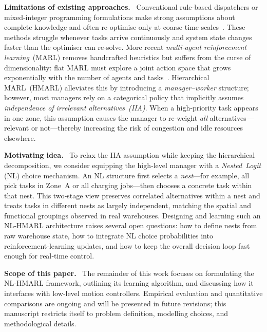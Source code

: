 \documentclass[journal,onecolumn]{IEEEtran}
\begin{document}
\vspace{2pt}
\textbf{Limitations of existing approaches.} %
Conventional rule‑based dispatchers or mixed‑integer programming formulations make strong assumptions about complete knowledge and often re‑optimise only at coarse time scales \citep{ratliff1983sshape,de_koster1997optimal}.%
These methods struggle whenever tasks arrive continuously and system state changes faster than the optimiser can re‑solve.%
More recent \emph{multi‑agent reinforcement learning} (MARL) removes handcrafted heuristics but suffers from the curse of dimensionality: flat MARL must explore a joint action space that grows exponentially with the number of agents and tasks \citep{alam2024dqn}.%
Hierarchical MARL (HMARL) alleviates this by introducing a \emph{manager–worker} structure; however, most managers rely on a categorical policy that implicitly assumes \emph{independence of irrelevant alternatives (IIA)}.%
When a high‑priority task appears in one zone, this assumption causes the manager to re‑weight \emph{all} alternatives—relevant or not—thereby increasing the risk of congestion and idle resources elsewhere.

\vspace{2pt}
\textbf{Motivating idea.} %
To relax the IIA assumption while keeping the hierarchical decomposition, we consider equipping the high‑level manager with a \emph{Nested Logit} (NL) choice mechanism.%
An NL structure first selects a \textit{nest}—for example, all pick tasks in Zone A or all charging jobs—then chooses a concrete task within that nest.%
This two‑stage view preserves correlated alternatives within a nest and treats tasks in different nests as largely independent, matching the spatial and functional groupings observed in real warehouses.%
Designing and learning such an NL‑HMARL architecture raises several open questions: how to define nests from raw warehouse state, how to integrate NL choice probabilities into reinforcement‑learning updates, and how to keep the overall decision loop fast enough for real‑time control.

\vspace{2pt}
\textbf{Scope of this paper.} %
The remainder of this work focuses on formulating the NL‑HMARL framework, outlining its learning algorithm, and discussing how it interfaces with low‑level motion controllers.%
Empirical evaluation and quantitative comparisons are ongoing and will be presented in future revisions; this manuscript restricts itself to problem definition, modelling choices, and methodological details.
\end{document}
